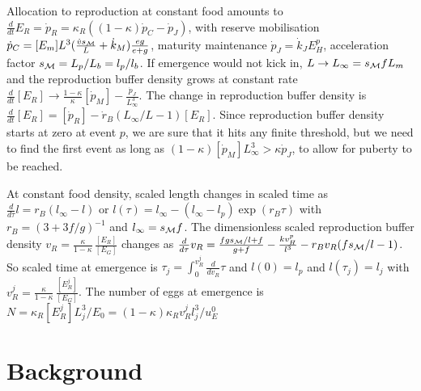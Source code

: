 \documentclass{article}
\begin{document}
Allocation to reproduction at constant food amounts to $\frac{d} {dt} E_R = \dot{p}_R = \kappa_R \left( (1 - \kappa) \dot{p}_C  - \dot{p}_J \right)$, with reserve mobilisation $\dot{p}_C = [E_m] L^3 (\frac{\dot{v} s_{\cal M}} {L} + \dot{k}_M) \frac{e g} {e + g}$, maturity maintenance $\dot{p}_J = \dot{k}_J E_H^p$, acceleration factor $s_{\cal M} = L_p/ L_b = l_p/ l_b$.
If emergence would not kick in, $L \rightarrow L_\infty = s_{\cal M} f L_m$ and the reproduction buffer density grows at constant rate $\frac{d} {dt} [E_R] \rightarrow \frac{1 - \kappa} {\kappa} [\dot{p}_M] - \frac{\dot{p}_J} {L_\infty^3}$. 
The change in reproduction buffer density is $\frac{d} {dt} [E_R] = [\dot{p}_R] - \dot{r}_B (L_\infty/ L - 1) [E_R]$.
Since reproduction buffer density starts at zero at event $p$, we are sure that it hits any finite threshold, but we need to find the first event as long as $(1 - \kappa) [\dot{p}_M] L_\infty^3 > \kappa \dot{p}_J$, to allow for puberty to be reached.

At constant food density, scaled length changes in scaled time as $\frac{d} {d \tau} l = r_B(l_\infty - l)$ or $l(\tau) = l_\infty - (l_\infty - l_p) \exp(r_B \tau)$ with $r_B = (3 + 3 f/g)^{-1}$ and $l_\infty = s_{\cal M} f$.
The dimensionless scaled reproduction buffer density $v_R = \frac{\kappa} {1 - \kappa} \, \frac{[E_R]} {[E_G]}$ changes as 
$\frac{d} {d \tau} v_R = \frac{f g s_{\cal M}/ l + f} {g + f} - \frac{k v_H^p} {l^3} - r_B v_R (f s_{\cal M} / l - 1)$.
So scaled time at emergence is $\tau_j = \int_0^{v_R^j} \frac{d} {d v_R} \tau$ and $l(0) = l_p$ and $l(\tau_j) = l_j$ with  $v_R^j = \frac{\kappa} {1 - \kappa} \, \frac{[E_R^j]} {[E_G]}$. 
The number of eggs at emergence is $N = \kappa_R [E_R^j] L_j^3/ E_0 = (1 - \kappa) \kappa_R v_R^j l_j^3/ u_E^0$




\section{Background}







\end{document}
